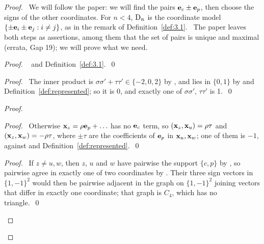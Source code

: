 \begin{proof}
 \pfsketch\ We will follow the paper: we will find the pairs ${\mathbf e}_c\pm{\mathbf e}_p$, then choose the
 signs of the other coordinates. For $n<4$, $\mathrm{D}_n$ is the coordinate model
 $\{\pm{\mathbf e}_i\pm{\mathbf e}_j:i\ne j\}$, as in the remark of Definition~\ref{def:3.1}.
 \repair\ The paper leaves both steps as assertions, among them that the set of pairs is
 unique and maximal (errata, Gap 19); we will prove what we need.
 \begin{proof}\pf\  and Definition~\ref{def:3.1}.~\qed\end{proof}
 \begin{proof}\pf\ The inner product is $\sigma\sigma'+\tau\tau'\in\{-2,0,2\}$ by
  , and lies in $\{0,1\}$ by  and Definition~\ref{def:represented}; so it is 0, and
  exactly one of $\sigma\sigma'$, $\tau\tau'$ is 1.~\qed\end{proof}
 \begin{proof}
  \begin{proof}\pf\ Otherwise ${\mathbf x}_z=\rho{\mathbf e}_p+\ldots$ has no ${\mathbf e}_c$ term, so
   $({\mathbf x}_z,{\mathbf x}_u)=\rho\tau$ and $({\mathbf x}_z,{\mathbf x}_w)=-\rho\tau$, where $\pm\tau$ are the coefficients
   of ${\mathbf e}_p$ in ${\mathbf x}_u,{\mathbf x}_w$; one of them is $-1$, against  and
   Definition~\ref{def:represented}.~\qed\end{proof}
  \qedstep
  \begin{proof}\pf\ If $z\ne u,w$, then $z$, $u$ and $w$ have pairwise the support $\{c,p\}$ by
   , so pairwise agree in exactly one of two coordinates by
   . Their three sign vectors in $\{1,-1\}^2$ would then be pairwise adjacent in
   the graph on $\{1,-1\}^2$ joining vectors that differ in exactly one coordinate; that graph
   is $C_4$, which has no triangle.~\qed\end{proof}

\end{proof}
\end{proof}
